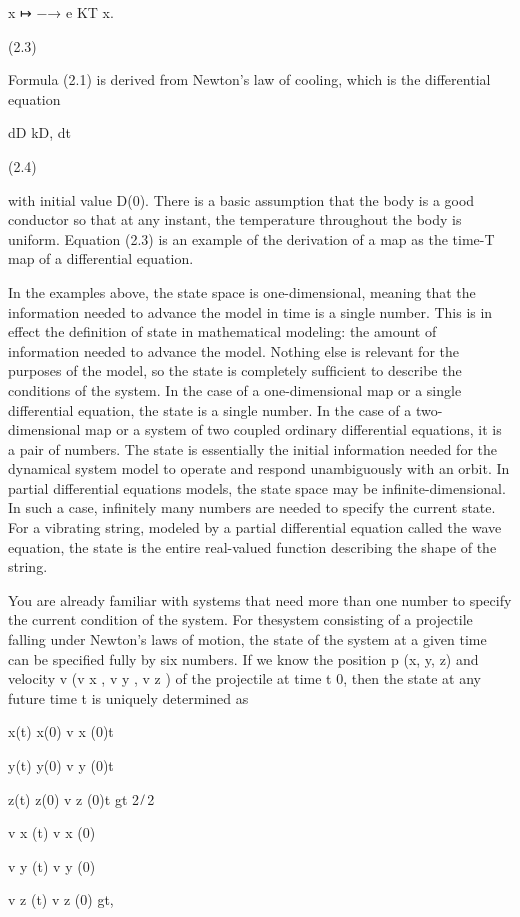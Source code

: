 \documentclass[12pt]{article}
\begin{document}
x ↦ −→ e KT x.

(2.3)

Formula (2.1) is derived from Newton’s law of cooling, which is the differential equation

dD  kD, dt

(2.4)

with initial value D(0). There is a basic assumption that the body is a good conductor so that at any instant, the temperature 
throughout the body is uniform. Equation (2.3) is an example of the derivation of a map as the time-T map of a differential equation.

In the examples above, the state space is one-dimensional, meaning that the information needed to advance the model in time is a 
single number. This is in effect the deﬁnition of state in mathematical modeling: the amount of information
needed to advance the model. Nothing else is relevant for the purposes of the model, so the state is completely sufﬁcient to 
describe the conditions of the system. In the case of a one-dimensional map or a single differential equation, the state is a single 
number. In the case of a two-dimensional map or a system of two coupled ordinary differential equations, it is a pair of numbers. The 
state is essentially the initial information needed for the dynamical system model to operate and respond unambiguously with an 
orbit. In partial differential equations models, the state space may be inﬁnite-dimensional. In such a case, inﬁnitely many numbers 
are needed to specify the current state. For a vibrating string, modeled by a partial differential equation called the wave equation, 
the state is the entire real-valued function describing the shape of the string.

You are already familiar with systems that need more than one number to specify the current condition of the system. For thesystem 
consisting of a projectile falling under Newton’s laws of motion, the state of the system at a given time can be speciﬁed fully by 
six numbers. If we know the position  p  (x, y, z) and velocity  v  (v x , v y , v z ) of the projectile at time t  0, then the state 
at any future time t is uniquely determined as

x(t)  x(0)  v x (0)t

y(t)  y(0)  v y (0)t

z(t)  z(0)  v z (0)t  gt 2 ̸ 2

v x (t)  v x (0)

v y (t)  v y (0)

v z (t)  v z (0)  gt,
\end{document}
